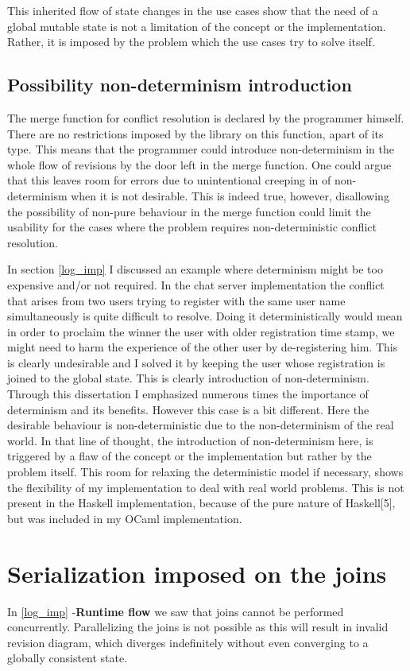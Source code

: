 \documentclass[12pt,twoside,notitlepage]{report}
\begin{document}
This inherited flow of state changes in the use cases show that the need of a global mutable state is not a limitation of the concept or the implementation. Rather, it is imposed by the problem which the use cases try to solve itself.  

\subsection{Possibility non-determinism introduction}
\label{eval_nondet}
The merge function for conflict resolution is declared by the programmer himself. There are no restrictions imposed by the library on this function, apart of its type. This means that the programmer could introduce non-determinism in the whole flow of revisions by the door left in the merge function. One could argue that this leaves room for errors due to unintentional creeping in of non-determinism when it is not desirable. This is indeed true, however, disallowing the possibility of non-pure behaviour in the merge function could limit the usability for the cases where the problem requires non-deterministic conflict resolution.
  
In section \ref{log_imp} I discussed an example where determinism might be too expensive and/or not required. In the chat server implementation the conflict that arises from two users trying to register with the same user name simultaneously is quite difficult to resolve. Doing it deterministically would mean in order to proclaim the winner the user with older registration time stamp,  we might need to harm the experience of the other user by de-registering him. This is clearly undesirable and I solved it by keeping the user whose registration is joined to the global state. This is clearly introduction of non-determinism. Through this dissertation I emphasized numerous times the importance of determinism and its benefits. However this case is a bit different. Here the desirable behaviour is non-deterministic due to the non-determinism of the real world. In that line of thought, the introduction of non-determinism here, is triggered by a flaw of the concept or the implementation but rather by the problem itself. This room for relaxing the deterministic model if necessary, shows the flexibility of my implementation to deal with real world problems. This is not present in the Haskell implementation, because of the pure nature of Haskell[5], but was included in my OCaml implementation.   

\section{Serialization imposed on the joins}
\label{eval_join}
In \ref{log_imp} -{\bfseries Runtime flow} we saw that joins cannot be performed concurrently. Parallelizing the joins is not possible as this will result in invalid revision diagram, which diverges indefinitely without even converging to a globally consistent state.
\end{document}
